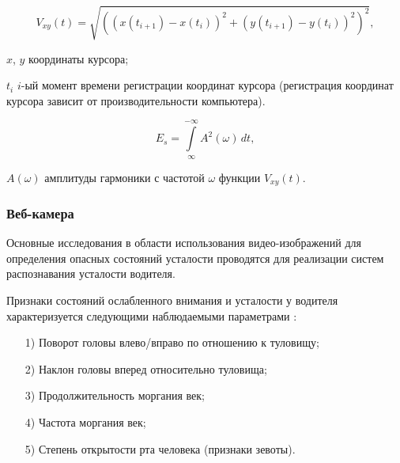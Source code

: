 \begin{equation}
\label{eq:harmonic}
V_{xy}(t) = \sqrt{((x(t_{i+1}) - x(t_i))^2 + (y(t_{i+1})-y(t_i))^2)^2},
\end{equation}

\begin{eqexpl}[15mm]
\item{$x$, $y$} координаты курсора;
\item{$t_i$} $i$-ый момент времени регистрации координат курсора (регистрация координат курсора зависит от производительности компьютера).
\end{eqexpl}

\begin{equation}
\label{eq:normir}
E_s = \int\limits_{\infty}^{-\infty} A^2(\omega)\,dt,
\end{equation}

\begin{eqexpl}[15mm]
\item{$A(\omega)$} амплитуды гармоники с частотой $\omega$ функции $V_{xy}(t)$.
\end{eqexpl}

\subsubsection{Веб-камера}
Основные исследования в области использования видео-изображений для определения опасных состояний усталости проводятся для реализации систем распознавания усталости водителя.

Признаки состояний ослабленного внимания и усталости у водителя характеризуется следующими наблюдаемыми параметрами \cite{videoMethod}:
\begin{itemize}[leftmargin=1.6\parindent]
\item[1)] Поворот головы влево/вправо по отношению к туловищу;
\item[2)] Наклон головы вперед относительно туловища;
\item[3)] Продолжительность моргания век;
\item[4)] Частота моргания век;
\item[5)] Степень открытости рта человека (признаки зевоты).
\end{itemize}

